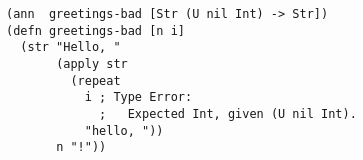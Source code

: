 \begin{verbatim}
(ann  greetings-bad [Str (U nil Int) -> Str])
(defn greetings-bad [n i]
  (str "Hello, "
       (apply str 
         (repeat 
           i ; Type Error:
             ;   Expected Int, given (U nil Int).
           "hello, "))
       n "!"))
\end{verbatim}



%
%
%
%
%
%
%


